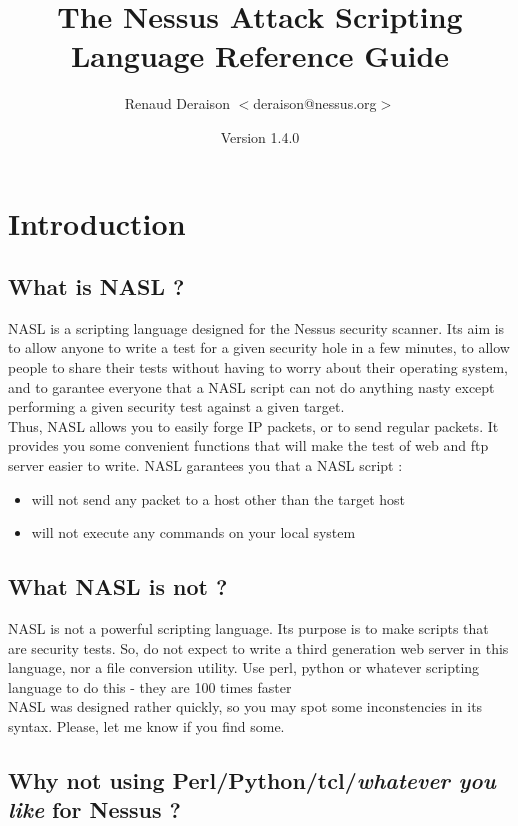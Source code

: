\documentclass{article}
\title{The Nessus Attack Scripting Language Reference Guide}
\author{Renaud Deraison $<$deraison@nessus.org$>$}
\date{Version 1.4.0}
\begin{document}
\maketitle
\tableofcontents
\newpage
\section{Introduction}

\subsection{What is NASL ?}

NASL is a scripting language designed for the Nessus security scanner. Its aim 
is to allow anyone to write a test for a given security hole in a few minutes,
to allow people to share their tests without having to worry about their 
operating system, and to garantee everyone that a NASL script can not do
anything nasty except performing a given security test against a given
target.\\
Thus, NASL allows you to easily forge IP packets, or to send regular packets.
It provides you some convenient functions that will make the test of web and
ftp server easier to write. NASL garantees you that a NASL script :
\begin{itemize}
\item will not send any packet to a host other than the target host
\item will not execute any commands on your local system
\end{itemize}



\subsection{What NASL is not ?}

NASL is not a powerful scripting language. Its purpose is to make scripts that 
are security tests. So, do not expect to write a third generation web server
in this language, nor a file conversion utility. 
Use perl, python or whatever scripting language to do this  - they are 100 times faster\\

NASL was designed rather quickly, so you may spot some inconstencies in its
syntax.
Please, let me know if you find some.



\subsection{Why not using Perl/Python/tcl/\textit{whatever you like} for Nessus ?}
\end{document}
